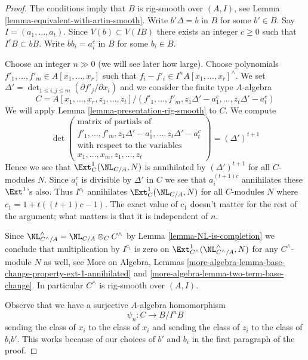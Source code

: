 \begin{proof}
The conditions imply that $B$ is rig-smooth over $(A, I)$, see
Lemma \ref{lemma-equivalent-with-artin-smooth}.
Write $b' \Delta = b$ in $B$ for some $b' \in B$.
Say $I = (a_1, \ldots, a_t)$. Since $V(b) \subset V(IB)$ there
exists an integer $c \geq 0$ such that $I^cB \subset bB$.
Write $bb_i = a_i^c$ in $B$ for some $b_i \in B$.

\medskip\noindent
Choose an integer $n \gg 0$ (we will see later how large).
Choose polynomials $f'_1, \ldots, f'_m \in A[x_1, \ldots, x_r]$
such that $f_i - f'_i \in I^nA[x_1, \ldots, x_r]^\wedge$.
We set $\Delta' = \det_{1 \leq i, j \leq m}(\partial f'_j/\partial x_i)$
and we consider the finite type $A$-algebra
$$
C = A[x_1, \ldots, x_r, z_1, \ldots, z_t]/
(f'_1, \ldots, f'_m,
z_1\Delta' - a_1^c, \ldots, z_t\Delta' - a_t^c)
$$
We will apply Lemma \ref{lemma-presentation-rig-smooth} to $C$.
We compute
$$
\det\left(
\begin{matrix}
\text{matrix of partials of} \\
f'_1, \ldots, f'_m, z_1\Delta' - a_1^c, \ldots, z_t\Delta' - a_t^c \\
\text{with respect to the variables} \\
x_1, \ldots, x_m, z_1, \ldots, z_t
\end{matrix}
\right) =
(\Delta')^{t + 1}
$$
Hence we see that $\Ext^1_C(\NL_{C/A}, N)$ is annihilated by
$(\Delta')^{t + 1}$ for all $C$-modules $N$. Since $a_i^c$ is
divisible by $\Delta'$ in $C$ we see that $a_i^{(t + 1)c}$ annihilates
these $\Ext^1$'s also. Thus $I^{c_1}$ annihilates
$\Ext^1_C(\NL_{C/A}, N)$ for all $C$-modules $N$
where $c_1 = 1 + t((t + 1)c - 1)$. The exact value of $c_1$ doesn't matter for
the rest of the argument; what matters is that it is independent of $n$.

\medskip\noindent
Since $\NL_{C^\wedge/A}^\wedge = \NL_{C/A} \otimes_C C^\wedge$ by
Lemma \ref{lemma-NL-is-completion} we conclude that multiplication
by $I^{c_1}$ is zero on $\Ext^1_{C^\wedge}(\NL_{C^\wedge/A}^\wedge, N)$
for any $C^\wedge$-module $N$ as well, see
More on Algebra, Lemmas
\ref{more-algebra-lemma-base-change-property-ext-1-annihilated} and
\ref{more-algebra-lemma-two-term-base-change}.
In particular $C^\wedge$ is rig-smooth over $(A, I)$.

\medskip\noindent
Observe that we have a surjective $A$-algebra homomorphism
$$
\psi_n : C \longrightarrow B/I^nB
$$
sending the class of $x_i$ to the class of $x_i$ and sending the class of
$z_i$ to the class of $b_ib'$. This works because of our choices of $b'$
and $b_i$ in the first paragraph of the proof.


\end{proof}
